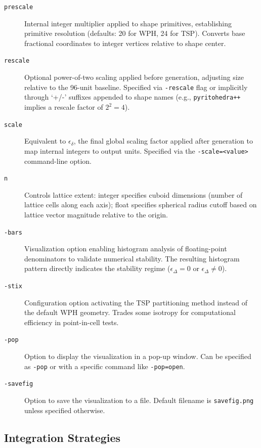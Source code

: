 \documentclass[10pt]{article}
\begin{document}
\begin{description}
    \item[\texttt{prescale}] Internal integer multiplier applied to shape primitives, establishing primitive resolution (defaults: 20 for WPH, 24 for TSP). Converts base fractional coordinates to integer vertices relative to shape center.

    \item[\texttt{rescale}] Optional power-of-two scaling applied before generation, adjusting size relative to the 96-unit baseline. Specified via \texttt{-rescale} flag or implicitly through `+/-' suffixes appended to shape names (e.g., \texttt{pyritohedra++} implies a rescale factor of $2^2=4$).

    \item[\texttt{scale}] Equivalent to $\epsilon_\delta$, the final global scaling factor applied after generation to map internal integers to output units. Specified via the \texttt{-scale=<value>} command-line option.

    \item[\texttt{n}] Controls lattice extent: integer specifies cuboid dimensions (number of lattice cells along each axis); float specifies spherical radius cutoff based on lattice vector magnitude relative to the origin.

    \item[\texttt{-bars}] Visualization option enabling histogram analysis of floating-point denominators to validate numerical stability. The resulting histogram pattern directly indicates the stability regime ($\epsilon_\Delta = 0$ or $\epsilon_\Delta \neq 0$).

    \item[\texttt{-stix}] Configuration option activating the TSP partitioning method instead of the default WPH geometry. Trades some isotropy for computational efficiency in point-in-cell tests.

    \item[\texttt{-pop}] Option to display the visualization in a pop-up window. Can be specified as \texttt{-pop} or with a specific command like \texttt{-pop=open}.

    \item[\texttt{-savefig}] Option to save the visualization to a file. Default filename is \texttt{savefig.png} unless specified otherwise.
\end{description}

\subsection{Integration Strategies}
\label{subsec-glossary-integration}
\end{document}
